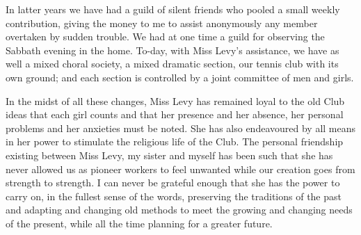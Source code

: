 In latter years we have had a guild of silent friends who
pooled a small weekly contribution, giving the money to
me to assist anonymously any member overtaken by
sudden trouble. We had at one time a guild for observing
the Sabbath evening in the home. To-day, with Miss
Levy’s assistance, we have as well a mixed choral society,
a mixed dramatic section, our tennis club with its own
ground; and each section is controlled by a joint committee
of men and girls.

In the midst of all these changes, Miss Levy has
remained loyal to the old Club ideas that each girl counts
and that her presence and her absence, her personal
problems and her anxieties must be noted. She has also
endeavoured by all means in her power to stimulate the
religious life of the Club. The personal friendship existing
between Miss Levy, my sister and myself has been
such that she has never allowed us as pioneer workers to
feel unwanted while our creation goes from strength to
strength. I can never be grateful enough that she has
the power to carry on, in the fullest sense of the words,
preserving the traditions of the past and adapting and
changing old methods to meet the growing and changing
needs of the present, while all the time planning for a
greater future.
